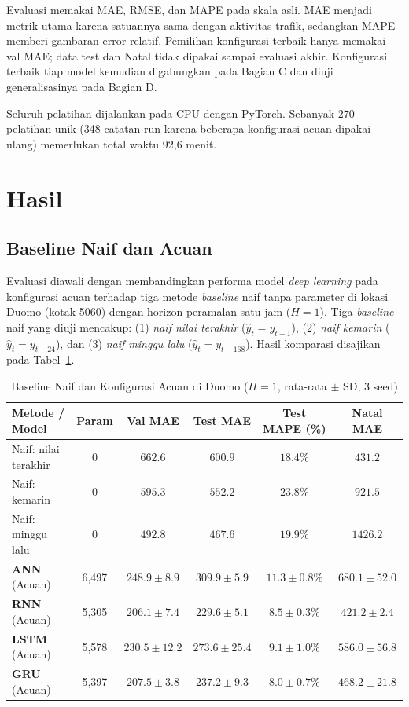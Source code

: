 \documentclass[conference,a4paper]{IEEEtran}
\begin{document}
Evaluasi memakai MAE, RMSE, dan MAPE pada skala asli. MAE menjadi metrik utama karena satuannya sama dengan aktivitas trafik, sedangkan MAPE memberi gambaran error relatif. Pemilihan konfigurasi terbaik hanya memakai val MAE; data test dan Natal tidak dipakai sampai evaluasi akhir. Konfigurasi terbaik tiap model kemudian digabungkan pada Bagian C dan diuji generalisasinya pada Bagian D.

Seluruh pelatihan dijalankan pada CPU dengan PyTorch. Sebanyak 270 pelatihan unik (348 catatan run karena beberapa konfigurasi acuan dipakai ulang) memerlukan total waktu 92,6 menit.

\section{Hasil}

\subsection{Baseline Naif dan Acuan}

Evaluasi diawali dengan membandingkan performa model \textit{deep learning} pada konfigurasi acuan terhadap tiga metode \textit{baseline} naif tanpa parameter di lokasi Duomo (kotak 5060) dengan horizon peramalan satu jam ($H = 1$). Tiga \textit{baseline} naif yang diuji mencakup: (1) \textit{naif nilai terakhir} ($\hat{y}_t = y_{t-1}$), (2) \textit{naif kemarin} ($\hat{y}_t = y_{t-24}$), dan (3) \textit{naif minggu lalu} ($\hat{y}_t = y_{t-168}$). Hasil komparasi disajikan pada Tabel~\ref{tab:baseline_acuan}.

\begin{table}[t]
  \centering
  \caption{Baseline Naif dan Konfigurasi Acuan di Duomo ($H=1$, rata-rata $\pm$ SD, 3 seed)}
  \label{tab:baseline_acuan}
  \begin{tabular}{@{}lccccc@{}}
    \toprule
    Metode / Model & Param & Val MAE & Test MAE & Test MAPE (\%) & Natal MAE \\
    \midrule
    Naif: nilai terakhir & 0 & $662.6$ & $600.9$ & $18.4\%$ & $431.2$ \\
    Naif: kemarin & 0 & $595.3$ & $552.2$ & $23.8\%$ & $921.5$ \\
    Naif: minggu lalu & 0 & $492.8$ & $467.6$ & $19.9\%$ & $1426.2$ \\
    \midrule
    \textbf{ANN} (Acuan) & 6,497 & $248.9 \pm 8.9$ & $309.9 \pm 5.9$ & $11.3 \pm 0.8\%$ & $680.1 \pm 52.0$ \\
    \textbf{RNN} (Acuan) & 5,305 & $206.1 \pm 7.4$ & $229.6 \pm 5.1$ & $8.5 \pm 0.3\%$ & $421.2 \pm 2.4$ \\
    \textbf{LSTM} (Acuan) & 5,578 & $230.5 \pm 12.2$ & $273.6 \pm 25.4$ & $9.1 \pm 1.0\%$ & $586.0 \pm 56.8$ \\
    \textbf{GRU} (Acuan) & 5,397 & $207.5 \pm 3.8$ & $237.2 \pm 9.3$ & $8.0 \pm 0.7\%$ & $468.2 \pm 21.8$ \\
    \bottomrule
  \end{tabular}
\end{table}
\end{document}
